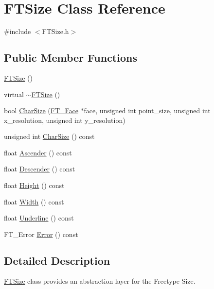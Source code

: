 \hypertarget{class_f_t_size}{}\section{F\+T\+Size Class Reference}
\label{class_f_t_size}


{\ttfamily \#include $<$F\+T\+Size.\+h$>$}

\subsection*{Public Member Functions}
\begin{DoxyCompactItemize}
\item 
\hyperlink{class_f_t_size_ae1b459031c2ab7fe6ef98530c0251700}{F\+T\+Size} ()
\item 
virtual \hyperlink{class_f_t_size_a7bf23332d879f3e9d76675290012b275}{$\sim$\+F\+T\+Size} ()
\item 
bool \hyperlink{class_f_t_size_a15c6c82655544d1edb101e00e42ffad9}{Char\+Size} (\hyperlink{struct_f_t___face_rec__}{F\+T\+\_\+\+Face} $\ast$face, unsigned int point\+\_\+size, unsigned int x\+\_\+resolution, unsigned int y\+\_\+resolution)
\item 
unsigned int \hyperlink{class_f_t_size_a489fba0a722afd8dfa2a67142cd51767}{Char\+Size} () const 
\item 
float \hyperlink{class_f_t_size_a7865c27cb979feace5ccce2fb544a490}{Ascender} () const 
\item 
float \hyperlink{class_f_t_size_a75c1b86d32c5ea1d296234edb1e4b7ab}{Descender} () const 
\item 
float \hyperlink{class_f_t_size_af0e7398f27936ffe4cbed04c3cfa889d}{Height} () const 
\item 
float \hyperlink{class_f_t_size_a8fe639fa29815a89cdd84138b2564840}{Width} () const 
\item 
float \hyperlink{class_f_t_size_ab85fb58156a855d01b5a4e9e1b91e0e2}{Underline} () const 
\item 
F\+T\+\_\+\+Error \hyperlink{class_f_t_size_a990a2df40c9c1ed06db8d34b2ac3580b}{Error} () const 
\end{DoxyCompactItemize}


\subsection{Detailed Description}
\hyperlink{class_f_t_size}{F\+T\+Size} class provides an abstraction layer for the Freetype Size.

